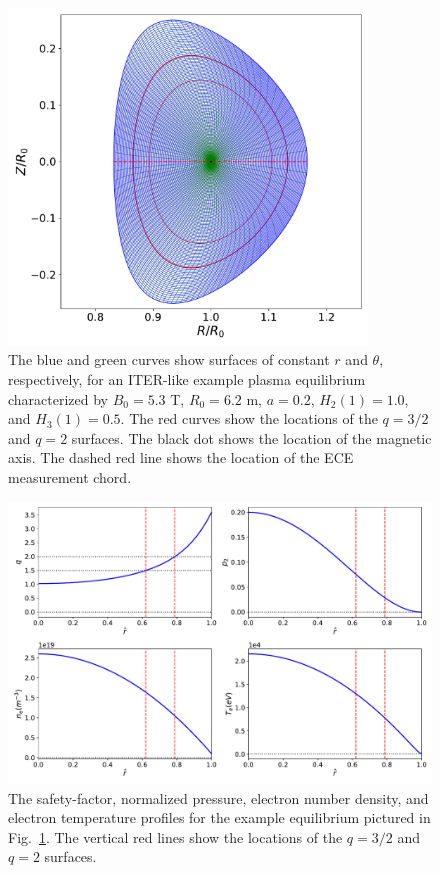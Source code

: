 \documentclass[12pt,prb,aps]{revtex4-1}
\begin{document}
\begin{figure}
\centerline{\includegraphics[width=0.85\textwidth]{Fig1.pdf}}
\caption{The blue and green curves show surfaces of constant $r$ and $\theta$, respectively, for an ITER-like example
plasma equilibrium characterized by $B_0=5.3$ T, $R_0=6.2$ m, $a=0.2$, $H_2(1)=1.0$, and $H_3(1)= 0.5$. The red curves show
the locations of the $q=3/2$ and $q=2$ surfaces. The black dot shows the location of the magnetic axis. The dashed red line shows the location of the ECE measurement chord. \label{figa}}
\end{figure}

\begin{figure}
\centerline{\includegraphics[width=1.0\textwidth]{Fig2.pdf}}
\caption{The safety-factor, normalized pressure, electron number density, and electron temperature profiles for the
example equilibrium pictured in Fig.~\ref{figa}. The vertical red lines show the locations of the $q=3/2$ and $q=2$
surfaces.   \label{figb}}
\end{figure}
\end{document}
